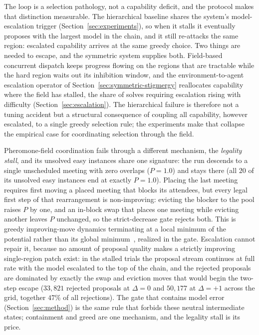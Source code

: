 The loop is a selection pathology, not a capability deficit, and the protocol makes that distinction measurable. The hierarchical baseline shares the system's model-escalation trigger (Section~\ref{sec:experiments}), so when it stalls it eventually proposes with the largest model in the chain, and it still re-attacks the same region: escalated capability arrives at the same greedy choice. Two things are needed to escape, and the symmetric system supplies both. Field-based concurrent dispatch keeps progress flowing on the regions that are tractable while the hard region waits out its inhibition window, and the environment-to-agent escalation operator of Section~\ref{sec:symmetric-stigmergy} reallocates capability where the field has stalled, the share of solves requiring escalation rising with difficulty (Section~\ref{sec:escalation}). The hierarchical failure is therefore not a tuning accident but a structural consequence of coupling all capability, however escalated, to a single greedy selection rule; the experiments make that collapse the empirical case for coordinating selection through the field.

Pheromone-field coordination fails through a different mechanism, the \emph{legality stall}, and its unsolved easy instances share one signature: the run descends to a single unscheduled meeting with zero overlaps ($P = 1.0$) and stays there (all $20$ of its unsolved easy instances end at exactly $P = 1.0$). Placing the last meeting requires first moving a placed meeting that blocks its attendees, but every legal first step of that rearrangement is non-improving: evicting the blocker to the pool raises $P$ by one, and an in-block swap that places one meeting while evicting another leaves $P$ unchanged, so the strict-decrease gate rejects both. This is greedy improving-move dynamics terminating at a local minimum of the potential rather than its global minimum~\cite{monderer1996potential}, realized in the gate. Escalation cannot repair it, because no amount of proposal quality makes a strictly improving single-region patch exist: in the stalled trials the proposal stream continues at full rate with the model escalated to the top of the chain, and the rejected proposals are dominated by exactly the swap and eviction moves that would begin the two-step escape ($33{,}821$ rejected proposals at $\Delta = 0$ and $50{,}177$ at $\Delta = +1$ across the grid, together $47\%$ of all rejections). The gate that contains model error (Section~\ref{sec:method}) is the same rule that forbids these neutral intermediate states; containment and greed are one mechanism, and the legality stall is its price.

